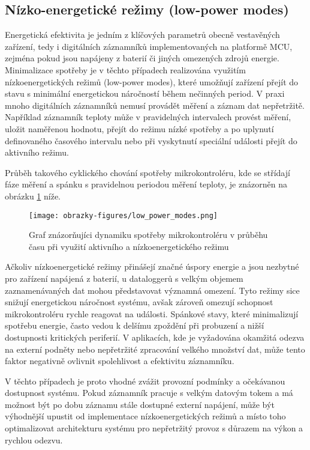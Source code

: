 \subsection{Nízko-energetické režimy (low-power modes)}
Energetická efektivita je jedním z klíčových parametrů obecně vestavěných zařízení, tedy i digitálních záznamníků implementovaných na platformě MCU, zejména pokud jsou napájeny z 
baterií či jiných omezených zdrojů energie. Minimalizace spotřeby je v těchto případech realizována využitím nízkoenergetických režimů (low-power modes), které umožňují zařízení přejít 
do stavu s minimální energetickou náročností během nečinných period. V praxi mnoho digitálních záznamníků nemusí provádět měření a záznam dat nepřetržitě. Například záznamník teploty může 
v pravidelných intervalech provést měření, uložit naměřenou hodnotu, přejít do režimu nízké spotřeby a po uplynutí definovaného časového intervalu nebo při vyskytnutí speciální události 
přejít do aktivního režimu. \cite{analog_devices_low_power_modes}

Průběh takového cyklického chování spotřeby mikrokontroléru, kde se střídají fáze měření a spánku s pravidelnou periodou měření teploty, je znázorněn na obrázku \ref{fig:low-power-modes} níže.

\begin{figure}[h]
    \centering
    \texttt{[image: obrazky-figures/low\_power\_modes.png]}
    
    \caption{Graf znázorňujíci dynamiku spotřeby mikrokontroléru v průběhu času při využití aktivního a nízkoenergetického režimu}
    \label{fig:low-power-modes}
\end{figure}

Ačkoliv nízkoenergetické režimy přinášejí značné úspory energie a jsou nezbytné pro zařízení napájená z baterií, u dataloggerů s velkým objemem zaznamenávaných dat mohou představovat 
významná omezení. Tyto režimy sice snižují energetickou náročnost systému, avšak zároveň omezují schopnost mikrokontroléru rychle reagovat na události. Spánkové stavy, které minimalizují 
spotřebu energie, často vedou k delšímu zpoždění při probuzení a nižší dostupnosti kritických periferií. V aplikacích, kde je vyžadována okamžitá odezva na externí podněty nebo nepřetržité 
zpracování velkého množství dat, může tento faktor negativně ovlivnit spolehlivost a efektivitu záznamníku. \cite{embedded_low_power_modes}

V těchto případech je proto vhodné zvážit provozní podmínky a očekávanou dostupnost systému. Pokud záznamník pracuje s velkým datovým tokem a má možnost být po dobu záznamu stále dostupné 
externí napájení, může být výhodnější upustit od implementace nízkoenergetických režimů a místo toho optimalizovat architekturu systému pro nepřetržitý provoz s důrazem na výkon a rychlou 
odezvu. \cite{analog_devices_low_power_modes}


